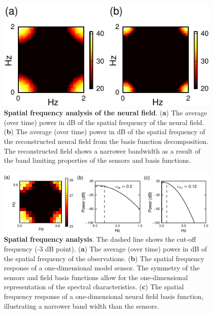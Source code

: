 \documentclass[12pt]{iopart}
\begin{document}
\begin{figure}[!ht]
\begin{center}
\includegraphics{./Graph/pdf/Figure4.pdf}
\end{center}
\caption{{\bf Spatial frequency analysis of the neural field}. (\textbf{a}) The average (over time) power in dB of the spatial frequency of the neural field. (\textbf{b}) The average (over time) power in dB of the spatial frequency of the reconstructed neural field from the basis function decomposition. The reconstructed field shows a narrower bandwidth as a result of the band limiting properties of the sensors and basis functions.}
\label{fig:Figure4}
\end{figure}

\begin{figure}[!ht] 
\begin{center}
\includegraphics{./Graph/pdf/Figure5.pdf}	
\end{center}
\caption{{\bf Spatial frequency analysis}. The dashed line shows the cut-off frequency (-3 dB point). (\textbf{a}) The average (over time) power in dB of the spatial frequency of the observations. (\textbf{b}) The spatial frequency response of a one-dimensional model sensor. The symmetry of the sensors and field basis functions allow for the one-dimensional representation of the spectral characteristics. (\textbf{c}) The spatial frequency response of a one-dimensional neural field basis function, illustrating a narrower band width than the sensors. }
\label{fig:Figure5}
\end{figure}
\end{document}
